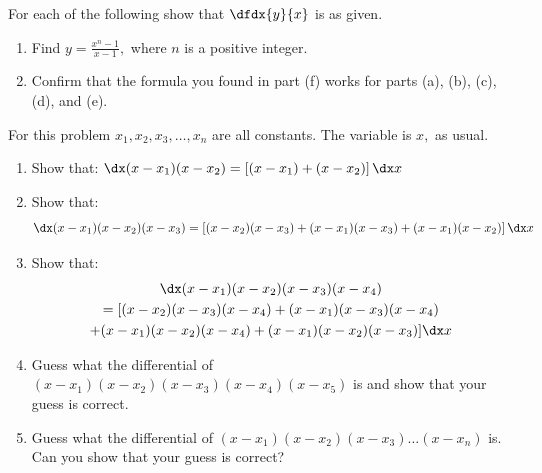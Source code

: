 \begin{ProblemSection}
  \begin{embeddedproblem}{}
    For each of the following show that $\dfdx{y}{x}$ is as given.
    \begin{enumerate}[label={\bf{}(\alph*)}]
    \item Find $\displaystyle y=\frac{x^n-1}{x-1},$ where $n$ is a
      positive integer.
    \item Confirm that the formula you found in part (f) works for
      parts (a), (b), (c), (d), and (e).
    \end{enumerate}
  \end{embeddedproblem}

  \begin{embeddedproblem}{}
    For this problem $x_1, x_2, x_3, \ldots, x_n$ are all
    constants. The variable is $x,$ as usual.
    \begin{enumerate}[label={\bf{}(\alph*)}]
    \item Show that:
      $\dx (x-x_1)(x-x_2) = \left[(x-x_1)+(x-x_2)\right]\dx x$
    \item Show that:
      \[\dx (x-x_1)(x-x_2)(x-x_3) = \left[(x-x_2)(x-x_3) +
          (x-x_1)(x-x_3) + (x-x_1)(x-x_2)\right]\dx x\]
    \item Show that:
      \begin{multline*}
        \dx (x-x_1)(x-x_2)(x-x_3)(x-x_4)\\ = [(x-x_2)(x-x_3)(x-x_4) +
        (x-x_1)(x-x_3)(x-x_4)\\ + (x-x_1)(x-x_2)(x-x_4) +
        (x-x_1)(x-x_2)(x-x_3)]\dx x
      \end{multline*}
    \item Guess what the differential of
      \( (x-x_1)(x-x_2)(x-x_3)(x-x_4)(x-x_5) \) is and show that your
      guess is correct.
    \item Guess what the differential of
      \( (x-x_1)(x-x_2)(x-x_3)\ldots(x-x_n) \) is. Can you show that
      your guess is correct?
    \end{enumerate}
  \end{embeddedproblem}


\end{ProblemSection}
